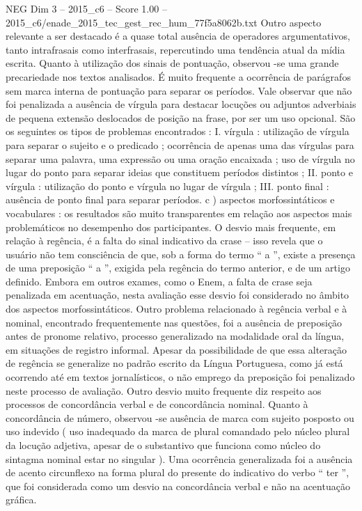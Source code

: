 \begin{textsample}{NEG Dim 3 – 2015\_c6 – Score 1.00 – 2015\_c6/enade\_2015\_tec\_gest\_rec\_hum\_77f5a8062b.txt}
Outro aspecto relevante a ser destacado é a quase total ausência de operadores argumentativos, tanto intrafrasais como interfrasais, repercutindo uma tendência atual da mídia escrita.
Quanto à utilização dos sinais de pontuação, observou -se uma grande precariedade nos textos analisados.
É muito frequente a ocorrência de parágrafos sem marca interna de pontuação para separar os períodos.
Vale observar que não foi penalizada a ausência de vírgula para destacar locuções ou adjuntos adverbiais de pequena extensão deslocados de posição na frase, por ser um uso opcional.
São os seguintes os tipos de problemas encontrados : I. vírgula : utilização de vírgula para separar o sujeito e o predicado ; ocorrência de apenas uma das vírgulas para separar uma palavra, uma expressão ou uma oração encaixada ; uso de vírgula no lugar do ponto para separar ideias que constituem períodos distintos ; II. ponto e vírgula : utilização do ponto e vírgula no lugar de vírgula ; III. ponto final : ausência de ponto final para separar períodos. c ) aspectos morfossintáticos e vocabulares : os resultados são muito transparentes em relação aos aspectos mais problemáticos no desempenho dos participantes.
O desvio mais frequente, em relação à regência, é a falta do sinal indicativo da crase – isso revela que o usuário não tem consciência de que, sob a forma do termo “ a ”, existe a presença de uma preposição “ a ”, exigida pela regência do termo anterior, e de um artigo definido.
Embora em outros exames, como o Enem, a falta de crase seja penalizada em acentuação, nesta avaliação esse desvio foi considerado no âmbito dos aspectos morfossintáticos.
Outro problema relacionado à regência verbal e à nominal, encontrado frequentemente nas questões, foi a ausência de preposição antes de pronome relativo, processo generalizado na modalidade oral da língua, em situações de registro informal.
Apesar da possibilidade de que essa alteração de regência se generalize no padrão escrito da Língua Portuguesa, como já está ocorrendo até em textos jornalísticos, o não emprego da preposição foi penalizado neste processo de avaliação.
Outro desvio muito frequente diz respeito aos processos de concordância verbal e de concordância nominal.
Quanto à concordância de número, observou -se ausência de marca com sujeito posposto ou uso indevido ( uso inadequado da marca de plural comandado pelo núcleo plural da locução adjetiva, apesar de o substantivo que funciona como núcleo do sintagma nominal estar no singular ).
Uma ocorrência generalizada foi a ausência de acento circunflexo na forma plural do presente do indicativo do verbo “ ter ”, que foi considerada como um desvio na concordância verbal e não na acentuação gráfica.

\end{textsample}
